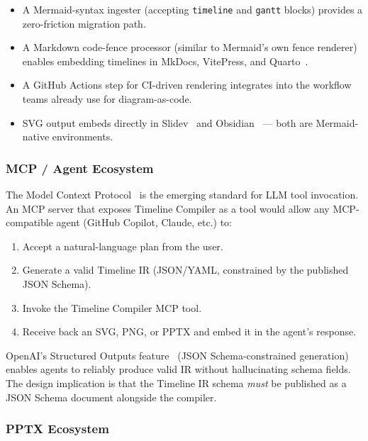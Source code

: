 \begin{itemize}
  \item A Mermaid-syntax ingester (accepting \texttt{timeline} and
        \texttt{gantt} blocks) provides a zero-friction migration path.
  \item A Markdown code-fence processor (similar to Mermaid's own fence
        renderer) enables embedding timelines in MkDocs, VitePress, and
        Quarto~\cite{mermaid2023}.
  \item A GitHub Actions step for CI-driven rendering integrates into
        the workflow teams already use for diagram-as-code.
  \item SVG output embeds directly in Slidev~\cite{slidev} and
        Obsidian~\cite{obsidian} --- both are Mermaid-native environments.
\end{itemize}

\subsubsection{MCP / Agent Ecosystem}

The Model Context Protocol~\cite{mcp-spec} is the emerging standard for
LLM tool invocation.
An MCP server that exposes Timeline Compiler as a tool would allow any
MCP-compatible agent (GitHub Copilot, Claude, etc.) to:

\begin{enumerate}
  \item Accept a natural-language plan from the user.
  \item Generate a valid Timeline IR (JSON/YAML, constrained by the
        published JSON Schema).
  \item Invoke the Timeline Compiler MCP tool.
  \item Receive back an SVG, PNG, or PPTX and embed it in the agent's
        response.
\end{enumerate}

\noindent
OpenAI's Structured Outputs feature~\cite{openai-structured-outputs}
(JSON Schema-constrained generation) enables agents to reliably produce
valid IR without hallucinating schema fields.
The design implication is that the Timeline IR schema \emph{must} be
published as a JSON Schema document alongside the compiler.

\subsubsection{PPTX Ecosystem}

